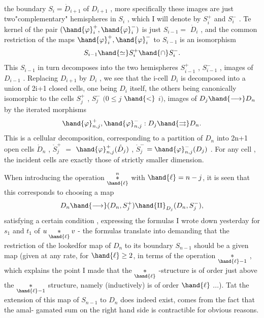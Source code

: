 
the boundary  $S_i = \dot{D}_{i+1}$ of $D_{i+1}$ , more specifically these images are
just two\allowbreak{}"complementary" hemispheres in $S_i$ , which I will denote by
$S_i^+$ and $S_i^-$ . Te kernel of the pair $(\hand{\varphi}_i^+ , \hand{\varphi}_i^-)$ is just $S_{i-1} =$ $\dot{D}_i$ ,
and the common restriction of the maps $\hand{\varphi}_i^+ , \hand{\varphi}_i^-$ to $S_{i-1}$ is an isomorphism
\[ S_{i-1} \hand{\simeq} S_i^+ \hand{\cap} S_i^- . \]
This $S_{i-1}$ in turn decomposes into the two hemispheres $S_{i-1}^+$ , $S_{i-1}^-$ ,
images of $D_{i-1}$ . Replacing $D_{i+1}$ by $D_i$ , we see that the i-cell $D_i$
is decomposed into a union of 2i+1 closed cells, one being $D_i$ itself,
the others being canonically isomorphic to the cells $S_j^+$ , $S_j^-$ $(0 \leq j$ $\hand{<}$ $i)$,
images of $D_j \hand{\longrightarrow} D_n$ by the iterated morphisms
\[ \hand{\varphi}_{n,j}^+ , \hand{\varphi}_{n,j}^- : D_j \hand{\rightrightarrows} D_n . \]
This is a cellular decomposition, corresponding to a partition of $D_n$
into 2n+1 open cells $\mathring{D}_n$ , $\mathring{S}_j^+$ $=$  $\hand{\varphi}_{n,j}^+(\mathring{D}_j)$ , $\mathring{S}_j^-$ $= \hand{\varphi}_{n,j}^-(D_j)$ . For
any cell , the incident cells are exactly those of strictly smaller
dimension.

When introducing the operation $\overset{n}{\underset{\hand{\ell}}{*}}$ with $\hand{\ell} = n-j$, it is seen that
this corresponds to choosing a map
\[ D_n \hand{\longrightarrow} (D_n , S_j^+) \hand{\amalg}_{D_j} (D_n , S_j^-) , \]
satisfying a certain condition \deleted{\unsure{$*$}}, expressing the formulas I wrote down
yesterday for $s_1$ and $t_1$ of $u \underset{\hand{\ell}}{*} v$ - the  formulas translate
into demanding that the restriction of the looked\hand{-}for map of $D_n$ to its
boundary $S_{n-1}$ should be a given map (given at any rate, for $\hand{\ell} \geq 2$, in
terms of the operation $\underset{\hand{\ell}-1}{*}$ , which explains the point I
made that the $\underset{\hand{\ell}}{*}$ -structure is of order just above the $\underset{\hand{\ell}-1}{*}$ structure,
namely (inductively) is of order $\hand{\ell}$ ...). Tat the extension of this
map of $S_{n-1}$ to $D_n$ does indeed exist, comes from the fact that the amal-%
gamated sum on the right hand side is contractible for obvious reasons.

